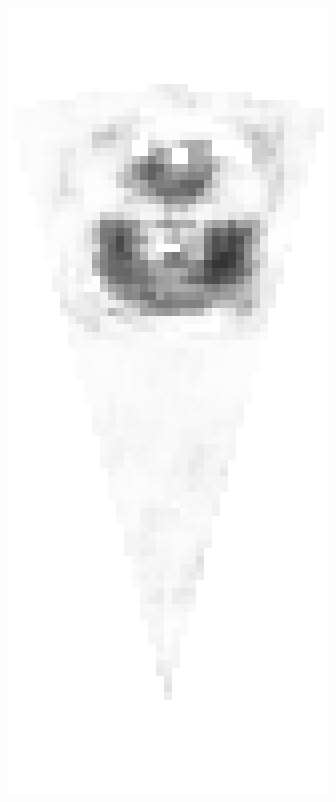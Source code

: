 \begin{figure}[!t]
{		\includegraphics[height=0.2\textheight]{chapters/images/proposals/unseen/large-tire-heatmap.jpg}
}
\end{figure}
